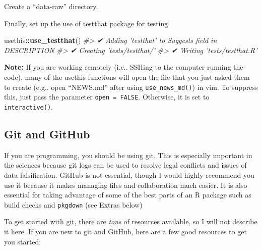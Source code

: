 \documentclass[]{book}
\newenvironment{Shaded}{\begin{snugshade}}{\end{snugshade}}
\newcommand{\KeywordTok}[1]{\textcolor[rgb]{0.13,0.29,0.53}{\textbf{#1}}}
\newcommand{\CommentTok}[1]{\textcolor[rgb]{0.56,0.35,0.01}{\textit{#1}}}
\newcommand{\OperatorTok}[1]{\textcolor[rgb]{0.81,0.36,0.00}{\textbf{#1}}}
\newcommand{\NormalTok}[1]{#1}
\begin{document}
Create a ``data-raw'' directory.

\begin{Shaded}
\end{Shaded}

Finally, set up the use of testthat package for testing.

\begin{Shaded}
\begin{Highlighting}[]
\NormalTok{usethis}\OperatorTok{::}\KeywordTok{use_testthat}\NormalTok{()}
\CommentTok{#> ✔ Adding 'testthat' to Suggests field in DESCRIPTION}
\CommentTok{#> ✔ Creating 'tests/testthat/'}
\CommentTok{#> ✔ Writing 'tests/testthat.R'}
\end{Highlighting}
\end{Shaded}

\textbf{Note:} If you are working remotely (i.e.. SSHing to the computer
running the code), many of the usethis functions will open the file that
you just asked them to create (e.g.. open ``NEWS.md'' after using
\texttt{use\_news\_md()}) in vim. To suppress this, just pass the
parameter \texttt{open\ =\ FALSE}. Otherwise, it is set to
\texttt{interactive()}.

\subsection{Git and GitHub}\label{git-and-github}

If you are programming, you should be using git. This is especially
important in the sciences because git logs can be used to resolve legal
conflicts and issues of data falsification. GitHub is not essential,
though I would highly recommend you use it because it makes managing
files and collaboration much easier. It is also essential for taking
advantage of some of the best parts of an R package such as build checks
and \texttt{pkgdown} (see Extras below)

To get started with git, there are \emph{tons} of resources available,
so I will not describe it here. If you are new to git and GitHub, here
are a few good resources to get you started:
\end{document}
